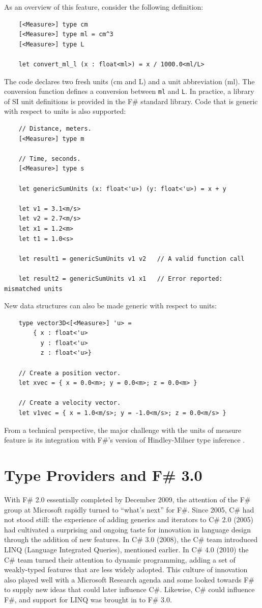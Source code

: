 \documentclass[acmsmall,screen]{acmart}
\begin{document}
As an overview of this feature, consider the following definition:

\begin{verbatim}
    [<Measure>] type cm
    [<Measure>] type ml = cm^3
    [<Measure>] type L

    let convert_ml_l (x : float<ml>) = x / 1000.0<ml/L>
\end{verbatim}

The code declares two fresh units (cm and L) and a unit abbreviation (ml).  The conversion function defines a conversion
between \texttt{ml} and \texttt{L}.  In practice, a library of SI unit definitions is provided in the F\# standard library.  Code
that is generic with respect to units is also supported:

\begin{verbatim}
    // Distance, meters.
    [<Measure>] type m

    // Time, seconds.
    [<Measure>] type s

    let genericSumUnits (x: float<'u>) (y: float<'u>) = x + y

    let v1 = 3.1<m/s>
    let v2 = 2.7<m/s>
    let x1 = 1.2<m>
    let t1 = 1.0<s>

    let result1 = genericSumUnits v1 v2   // A valid function call

    let result2 = genericSumUnits v1 x1   // Error reported: mismatched units
\end{verbatim}
New data structures can also be made generic with respect to units:
\begin{verbatim}
    type vector3D<[<Measure>] 'u> =
        { x : float<'u>
          y : float<'u>
          z : float<'u>}

    // Create a position vector.
    let xvec = { x = 0.0<m>; y = 0.0<m>; z = 0.0<m> }

    // Create a velocity vector.
    let v1vec = { x = 1.0<m/s>; y = -1.0<m/s>; z = 0.0<m/s> }
\end{verbatim}
From a technical perspective, the major challenge with the units of measure feature is its integration with F\#’s version of Hindley-Milner type inference \citep{Kennedy2009}.


\section*{Type Providers and F\# 3.0 }

With F\# 2.0 essentially completed by December 2009, the attention of the F\# group at Microsoft rapidly turned to “what’s next”
for F\#. Since 2005, C\# had not stood still: the experience of adding generics and iterators to C\# 2.0 (2005) had cultivated a
surprising and ongoing taste for innovation in language design through the addition of new features.  In C\# 3.0 (2008), the
C\# team introduced LINQ (Language Integrated Queries), mentioned earlier. In C\# 4.0 (2010) the C\# team turned their
attention to dynamic programming, adding a set of weakly-typed features that are less widely adopted. This culture of innovation
also played well with a Microsoft Research agenda and some looked towards F\# to supply new ideas that could later influence
C\#.  Likewise, C\# could influence F\#, and support for LINQ was brought in to F\# 3.0.
\end{document}
